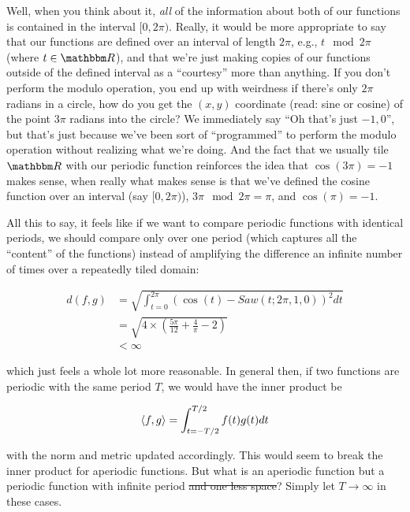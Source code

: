 \documentclass[letterpaper,12pt]{report}
\begin{document}
Well, when you think about it, \emph{all} of the information
about both of our functions 
is contained in the interval \([0, 2\pi)\).
Really, it would be more appropriate to say that our
functions are defined over an interval of length \(2\pi\),
e.g.,
\(t \mod 2\pi \) (where \(t \in \domain{R}\)), and that
we're just making copies of our functions outside of
the defined interval as a ``courtesy'' more than
anything. If you don't perform the modulo operation,
you end up with weirdness \textemdash{} if there's only
\(2\pi\) radians in a circle, how do you get the
\((x,y)\) coordinate (read: sine or cosine) of the
point \(3\pi\) radians into the circle? We immediately
say ``Oh that's just \(-1,0\)'', but that's just because
we've been sort of ``programmed'' to perform the modulo
operation without realizing what we're doing.
And the
fact that we usually tile \(\domain{R}\) 
with our periodic function
reinforces the idea that \(\cos(3\pi) = -1\) makes sense, when
really what makes sense is that we've defined the cosine function
over an interval (say \([0, 2\pi)\)), \(3\pi \mod 2\pi = \pi\),
and \(\cos(\pi) = -1\).\par

All this to say, it feels like if we want to compare periodic
functions with identical periods, we should compare
only over one period (which captures all the ``content''
of the functions) instead of amplifying the difference an
infinite number of times over a repeatedly tiled domain:

\[
\begin{split} d(f,g) &= \sqrt{\int_{t = 0}^{2\pi} \left(\cos(t) - Saw(t; 2\pi, 1, 0)\right)^2 dt} \\
  &= \sqrt{4 \times \left(\frac{5\pi}{12} + \frac{4}{\pi} - 2\right)} \\
  &< \infty
\end{split}
\]

which just feels a whole lot more reasonable.
In general then, if two functions are periodic with the same period \(T\),
we would have the inner product be

\[\innerprod[f][g] = \int_{t=-T/2}^{T/2} f(t)g(t) dt \]

with the norm and metric updated accordingly.
This would seem to break the inner product for aperiodic functions.
But what is an aperiodic function but a periodic function with
infinite period \sout{and one less space}?
Simply let \(T \rightarrow \infty\) in these cases.
\end{document}
